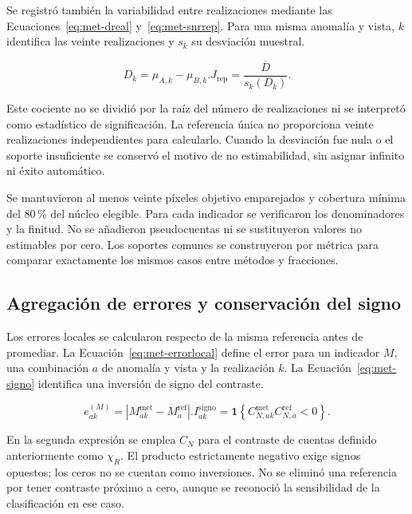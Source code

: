 Se registró también la variabilidad entre realizaciones mediante las Ecuaciones~\eqref{eq:met-dreal} y~\eqref{eq:met-snrrep}. Para una misma anomalía y vista, $k$ identifica las veinte realizaciones y $s_k$ su desviación muestral.
\begin{samepage}\begin{subequations}
\begin{equation}D_k=\mu_{A,k}-\mu_{B,k}.\label{eq:met-dreal}\end{equation}
\begin{equation}J_{\mathrm{rep}}=\frac{\overline D}{s_k(D_k)}.\label{eq:met-snrrep}\end{equation}
\end{subequations}\end{samepage}
Este cociente no se dividió por la raíz del número de realizaciones ni se interpretó como estadístico de significación. La referencia única no proporciona veinte realizaciones independientes para calcularlo. Cuando la desviación fue nula o el soporte insuficiente se conservó el motivo de no estimabilidad, sin asignar infinito ni éxito automático.

Se mantuvieron al menos veinte píxeles objetivo emparejados y cobertura mínima del 80\,\% del núcleo elegible. Para cada indicador se verificaron los denominadores y la finitud. No se añadieron pseudocuentas ni se sustituyeron valores no estimables por cero. Los soportes comunes se construyeron por métrica para comparar exactamente los mismos casos entre métodos y fracciones.

\subsection{Agregación de errores y conservación del signo}
Los errores locales se calcularon respecto de la misma referencia antes de promediar. La Ecuación~\eqref{eq:met-errorlocal} define el error para un indicador $M$, una combinación $a$ de anomalía y vista y la realización $k$. La Ecuación~\eqref{eq:met-signo} identifica una inversión de signo del contraste.
\begin{samepage}\begin{subequations}
\begin{equation}e_{ak}^{(M)}=\left|M_{ak}^{\mathrm{met}}-M_a^{\mathrm{ref}}\right|.\label{eq:met-errorlocal}\end{equation}
\begin{equation}I_{ak}^{\mathrm{signo}}=\mathbf1\!\left\{C_{N,ak}^{\mathrm{met}}C_{N,a}^{\mathrm{ref}}<0\right\}.\label{eq:met-signo}\end{equation}
\end{subequations}\end{samepage}
En la segunda expresión se emplea $C_N$ para el contraste de cuentas definido anteriormente como $\chi_R$. El producto estrictamente negativo exige signos opuestos; los ceros no se cuentan como inversiones. No se eliminó una referencia por tener contraste próximo a cero, aunque se reconoció la sensibilidad de la clasificación en ese caso.


